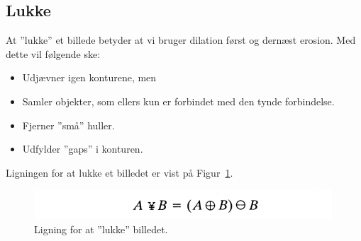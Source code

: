 \subsection{Lukke}

At ''lukke'' et billede betyder at vi bruger dilation først og dernæst erosion. Med dette vil følgende ske:

\begin{itemize}
	\item Udjævner igen konturene, men
	\item Samler objekter, som ellers kun er forbindet med den tynde forbindelse.
	\item Fjerner ''små'' huller.
	\item Udfylder ''gaps'' i konturen.
\end{itemize}

Ligningen for at lukke et billedet er vist på Figur~\ref{fig:closingeq}.

\begin{figure}[H]
	\centering
	\includegraphics[width=0.6\linewidth]{figs/spm09/closingeq}
	\caption{Ligning for at ''lukke'' billedet.}
	\label{fig:closingeq}
\end{figure}
